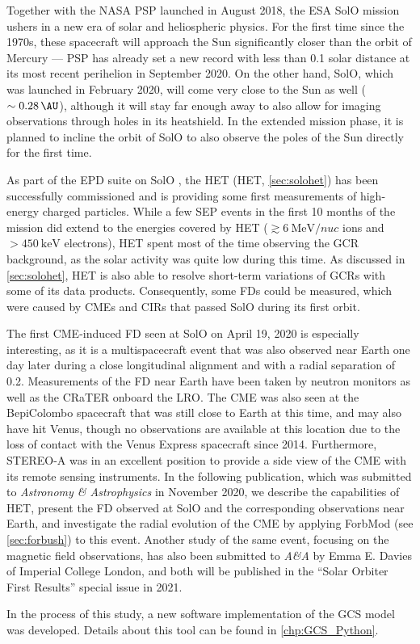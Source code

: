 Together with the NASA \ac{PSP} launched in August 2018, the ESA \ac{SolO} mission ushers in a new era of solar and heliospheric physics. For the first time since the 1970s, these spacecraft will approach the Sun significantly closer than the orbit of Mercury --- \ac{PSP} has already set a new record with less than \SI{0.1}{\AU} solar distance at its most recent perihelion in September 2020. On the other hand, \ac{SolO}, which was launched in February 2020, will come very close to the Sun as well ($\sim\SI{0.28}{\AU}$), although it will stay far enough away to also allow for imaging observations through holes in its heatshield. In the extended mission phase, it is planned to incline the orbit of \ac{SolO} to also observe the poles of the Sun directly for the first time.

As part of the \ac{EPD} suite on \ac{SolO} \citep{RodriguezPacheco-2019-EPD}, the \acl{HET} (\acs{HET}, \autoref{sec:solohet}) has been successfully commissioned and is providing some first measurements of high-energy charged particles. While a few \ac{SEP} events in the first 10 months of the mission did extend to the energies covered by \ac{HET} ($\gtrsim\SI{6}{\mega\electronvolt\per nuc}$ ions and $>\SI{450}{\kilo\electronvolt}$ electrons), \ac{HET} spent most of the time observing the \ac{GCR} background, as the solar activity was quite low during this time. As discussed in \autoref{sec:solohet}, \ac{HET} is also able to resolve short-term variations of \acp{GCR} with some of its data products. Consequently, some \acp{FD} could be measured, which were caused by \acp{CME} and \acp{CIR} that passed \ac{SolO} during its first orbit.

The first \ac{CME}-induced \ac{FD} seen at \ac{SolO} on April 19, 2020 is especially interesting, as it is a multispacecraft event that was also observed near Earth one day later during a close longitudinal alignment and with a radial separation of \SI{0.2}{\AU}. Measurements of the \ac{FD} near Earth have been taken by neutron monitors as well as the \ac{CRaTER} onboard the \ac{LRO}. The \ac{CME} was also seen at the BepiColombo spacecraft that was still close to Earth at this time, and may also have hit Venus, though no observations are available at this location due to the loss of contact with the Venus Express spacecraft since 2014. Furthermore, \acs{STEREO}-A was in an excellent position to provide a side view of the \ac{CME} with its remote sensing instruments. In the following publication, which was submitted to \textit{Astronomy \& Astrophysics} in November 2020, we describe the capabilities of \ac{HET}, present the \ac{FD} observed at \ac{SolO} and the corresponding observations near Earth, and investigate the radial evolution of the \ac{CME} by applying \acs{ForbMod} (see \autoref{sec:forbush}) to this event. Another study of the same event, focusing on the magnetic field observations, has also been submitted to \textit{A\&A} by Emma E. Davies of Imperial College London, and both will be published in the ``Solar Orbiter First Results'' special issue in 2021.

In the process of this study, a new software implementation of the \ac{GCS} model \citep{Thernisien-2011-GCS} was developed. Details about this tool can be found in \autoref{chp:GCS_Python}.

